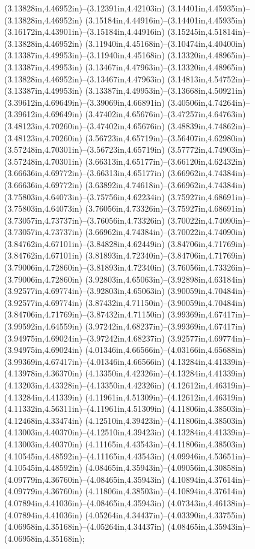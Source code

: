 (3.13828in,4.46952in)--(3.12391in,4.42103in) (3.14401in,4.45935in)--(3.13828in,4.46952in) (3.15184in,4.44916in)--(3.14401in,4.45935in) (3.16172in,4.43901in)--(3.15184in,4.44916in) (3.15245in,4.51814in)--(3.13828in,4.46952in) (3.11940in,4.45168in)--(3.10474in,4.40400in) (3.13387in,4.49953in)--(3.11940in,4.45168in) (3.13320in,4.48965in)--(3.13387in,4.49953in) (3.13467in,4.47963in)--(3.13320in,4.48965in) (3.13828in,4.46952in)--(3.13467in,4.47963in) (3.14813in,4.54752in)--(3.13387in,4.49953in) (3.13387in,4.49953in)--(3.13668in,4.50921in) (3.39612in,4.69649in)--(3.39069in,4.66891in) (3.40506in,4.74264in)--(3.39612in,4.69649in) (3.47402in,4.65676in)--(3.47257in,4.64763in) (3.48123in,4.70260in)--(3.47402in,4.65676in) (3.48839in,4.74862in)--(3.48123in,4.70260in) (3.56723in,4.65719in)--(3.56407in,4.62980in) (3.57248in,4.70301in)--(3.56723in,4.65719in) (3.57772in,4.74903in)--(3.57248in,4.70301in) (3.66313in,4.65177in)--(3.66120in,4.62432in) (3.66636in,4.69772in)--(3.66313in,4.65177in) (3.66962in,4.74384in)--(3.66636in,4.69772in) (3.63892in,4.74618in)--(3.66962in,4.74384in) (3.75803in,4.64073in)--(3.75756in,4.62234in) (3.75927in,4.68691in)--(3.75803in,4.64073in) (3.76056in,4.73326in)--(3.75927in,4.68691in) (3.73057in,4.73737in)--(3.76056in,4.73326in) (3.70022in,4.74090in)--(3.73057in,4.73737in) (3.66962in,4.74384in)--(3.70022in,4.74090in) (3.84762in,4.67101in)--(3.84828in,4.62449in) (3.84706in,4.71769in)--(3.84762in,4.67101in) (3.81893in,4.72340in)--(3.84706in,4.71769in) (3.79006in,4.72860in)--(3.81893in,4.72340in) (3.76056in,4.73326in)--(3.79006in,4.72860in) (3.92803in,4.65063in)--(3.92898in,4.63184in) (3.92577in,4.69774in)--(3.92803in,4.65063in) (3.90059in,4.70484in)--(3.92577in,4.69774in) (3.87432in,4.71150in)--(3.90059in,4.70484in) (3.84706in,4.71769in)--(3.87432in,4.71150in) (3.99369in,4.67417in)--(3.99592in,4.64559in) (3.97242in,4.68237in)--(3.99369in,4.67417in) (3.94975in,4.69024in)--(3.97242in,4.68237in) (3.92577in,4.69774in)--(3.94975in,4.69024in) (4.01346in,4.66566in)--(4.03166in,4.65688in) (3.99369in,4.67417in)--(4.01346in,4.66566in) (4.13284in,4.41339in)--(4.13978in,4.36370in) (4.13350in,4.42326in)--(4.13284in,4.41339in) (4.13203in,4.43328in)--(4.13350in,4.42326in) (4.12612in,4.46319in)--(4.13284in,4.41339in) (4.11961in,4.51309in)--(4.12612in,4.46319in) (4.11332in,4.56311in)--(4.11961in,4.51309in) (4.11806in,4.38503in)--(4.12468in,4.33474in) (4.12510in,4.39423in)--(4.11806in,4.38503in) (4.13003in,4.40370in)--(4.12510in,4.39423in) (4.13284in,4.41339in)--(4.13003in,4.40370in) (4.11165in,4.43543in)--(4.11806in,4.38503in) (4.10545in,4.48592in)--(4.11165in,4.43543in) (4.09946in,4.53651in)--(4.10545in,4.48592in) (4.08465in,4.35943in)--(4.09056in,4.30858in) (4.09779in,4.36760in)--(4.08465in,4.35943in) (4.10894in,4.37614in)--(4.09779in,4.36760in) (4.11806in,4.38503in)--(4.10894in,4.37614in) (4.07894in,4.41036in)--(4.08465in,4.35943in) (4.07343in,4.46138in)--(4.07894in,4.41036in) (4.05264in,4.34437in)--(4.03390in,4.33755in) (4.06958in,4.35168in)--(4.05264in,4.34437in) (4.08465in,4.35943in)--(4.06958in,4.35168in);

